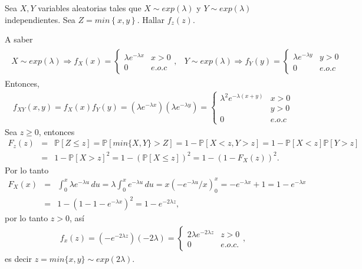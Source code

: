 \begin{Ejem}
\item  Sea $X,Y$ variables aleatorias tales que $X \sim exp \left( \lambda \right)$ y $Y \sim exp \left( \lambda\right)$ independientes. Sea $Z=min\left\{x,y\right\}$. Hallar $f_{z} \left( z \right)$.

A saber
\begin{eqnarray*}
\begin{array}{cc}
X\sim exp \left(\lambda\right) \Rightarrow f_{X}\left( x \right)= 
\begin{cases}
\lambda e^{- \lambda x }  & x > 0\\
0 & e.o.c
\end{cases}
,&
Y\sim exp \left(\lambda\right) \Rightarrow f_{Y}\left( y \right)= 
\begin{cases}
\lambda e^{- \lambda y }  & y > 0\\
0 & e.o.c
\end{cases}
\end{array}
\end{eqnarray*}
Entonces,
\begin{eqnarray*}
f_{XY} \left( x,y\right) = f_{X}\left(x\right)f_{Y}\left(y\right)= \left(\lambda e^{- \lambda x} \right)\left(\lambda e ^{-\lambda y } \right)=
\begin{cases}
\lambda^{2} e^{- \lambda \left(x+y \right) }  & x > 0\\
& y>0\\
0 & e.o.c
\end{cases}
\end{eqnarray*}
Sea $z\geq 0$, entonces
\begin{eqnarray*}
F_{z} \left( z \right)&=& \mathbb{P} \left[Z \leq z \right]= \mathbb{P} \left[ min \{X,Y \} > Z \right]=1- \mathbb{P} \left[ X < z , Y > z\right]= 1- \mathbb{P} \left[ X < z\right]\mathbb{P}\left[ Y > z\right]\\
&=& 1-\mathbb{P}\left[ X > z\right]^{2} =  1 -\left( \mathbb{P} \left[ X \leq z\right] \right) ^{2}=1 - \left( 1- F_{X} \left( z \right) \right)^{2}.
\end{eqnarray*}
Por lo tanto
\begin{eqnarray*}
F_{X} \left( x \right) &=& \int_{0}^{x} \lambda e^{-\lambda u} \, du = \lambda \int_{0}^{x}  e^{-\lambda u} \, du = x\left(-e ^{- \lambda u} /\! x\right)_{0}^{x}= -e ^{- \lambda x} + 1 = 1 -e ^{- \lambda x}\\
&=& 1 - \left(1-1-e ^{- \lambda x} \right)^{2} = 1- e ^{- 2 \lambda z},
\end{eqnarray*}
por lo tanto $z>0$, as\'i
\begin{eqnarray*}
f_{x}\left(z \right) = \left(-e^{-2 \lambda z } \right)\left(-2 \lambda \right)= 
\begin{cases}
2 \lambda e^{-2 \lambda z }  & z > 0\\
0 & e.o.c.
\end{cases},
\end{eqnarray*}
es decir $z=min\{x,y\}\sim exp\left( 2 \lambda \right) $.
\end{Ejem}
